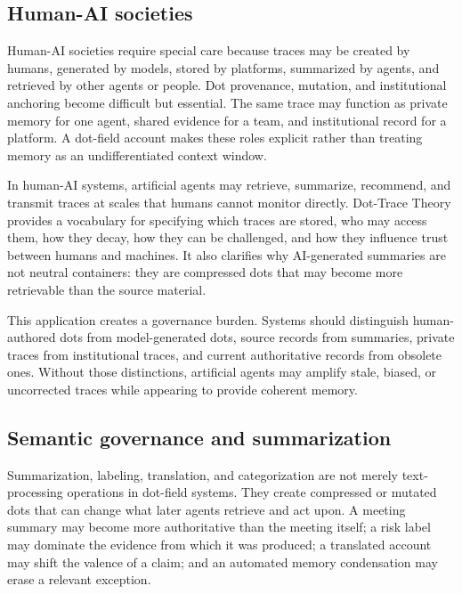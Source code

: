 \documentclass[11pt]{article}
\theoremstyle{remark}
\begin{document}
\subsection{Human-AI societies}\label{human-ai-societies}

Human-AI societies require special care because traces may be created by humans, generated by models, stored by platforms, summarized by agents, and retrieved by other agents or people. Dot provenance, mutation, and institutional anchoring become difficult but essential. The same trace may function as private memory for one agent, shared evidence for a team, and institutional record for a platform. A dot-field account makes these roles explicit rather than treating memory as an undifferentiated context window.

In human-AI systems, artificial agents may retrieve, summarize, recommend, and transmit traces at scales that humans cannot monitor directly. Dot-Trace Theory provides a vocabulary for specifying which traces are stored, who may access them, how they decay, how they can be challenged, and how they influence trust between humans and machines. It also clarifies why AI-generated summaries are not neutral containers: they are compressed dots that may become more retrievable than the source material.

This application creates a governance burden. Systems should distinguish human-authored dots from model-generated dots, source records from summaries, private traces from institutional traces, and current authoritative records from obsolete ones. Without those distinctions, artificial agents may amplify stale, biased, or uncorrected traces while appearing to provide coherent memory.

\subsection{Semantic governance and summarization}\label{semantic-governance-and-summarization}

Summarization, labeling, translation, and categorization are not merely text-processing operations in dot-field systems. They create compressed or mutated dots that can change what later agents retrieve and act upon. A meeting summary may become more authoritative than the meeting itself; a risk label may dominate the evidence from which it was produced; a translated account may shift the valence of a claim; and an automated memory condensation may erase a relevant exception.
\end{document}
